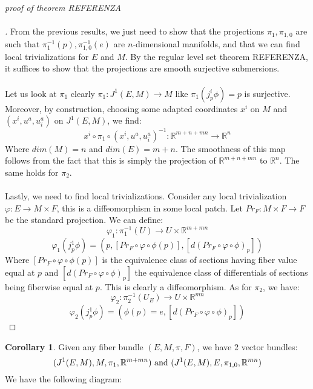 \documentclass[12pt,a4paper]{report}
\theoremstyle{definition}
\theoremstyle{Theorem}
\theoremstyle{definition}
\theoremstyle{definition}
\newtheorem{Cor}[Def]{Corollary}
\begin{document}
	\begin{proof}[proof of theorem REFERENZA\\\\]
		From the previous results, we just need to show that the projections $\pi_1,\pi_{1,0}$ are such that $\pi_1^{-1}(p),\pi^{-1}_{1,0}(e)$ are $n$-dimensional manifolds, and that we can find local trivializations for $E$ and $M$. By the regular level set theorem REFERENZA, it suffices to show that the projections are smooth surjective submersions.\\\\
		Let us look at $\pi_1$ clearly $\pi_1:J^1(E,M)\rightarrow M$ like $\pi_1(j^i_p\phi)=p$ is surjective. Moreover, by construction, choosing some adapted coordinates $x^i$ on $M$ and $(x^i,u^a,u^a_i)$ on $J^1(E,M)$, we find:
		$$x^i\circ \pi_1 \circ (x^i,u^a,u^a_i)^{-1}:\mathbb{R}^{m+n+mn}\rightarrow \mathbb{R}^n$$
		Where $dim(M)=n$ and $dim(E)=m+n$. The smoothness of this map follows from the fact that this is simply the projection of $\mathbb{R}^{m+n+mn}$ to $\mathbb{R}^n$. The same holds for $\pi_2$.\\
		\\
		Lastly, we need to find local trivializations. Consider any local trivialization $\varphi:E\rightarrow M\times F$, this is a diffeomorphism in some local patch. Let $Pr_F:M\times F\rightarrow F$ be the standard projection. We can define:
		$$\varphi_1:\pi_1^{-1}(U)\rightarrow U\times \mathbb{R}^{m+mn}$$
		$$\varphi_1(j^1_p\phi)=(p,[Pr_F\circ \varphi\circ\phi(p)],[d(Pr_F\circ \varphi\circ\phi)_p])$$
		Where $[Pr_F\circ \varphi\circ\phi(p)]$ is the equivalence class of sections having fiber value equal at $p$ and $[d(Pr_F\circ \varphi\circ\phi)_p]$ the equivalence class of differentials of sections being fiberwise equal at $p$. This is clearly a diffeomorphism. As for $\pi_2$, we have:
		$$\varphi_2:\pi_2^{-1}(U_E)\rightarrow U\times \mathbb{R}^{mn}$$
		$$\varphi_2(j_p^1\phi)=(\phi(p)=e,[d(Pr_F\circ \varphi\circ\phi)_p])$$
	\end{proof}
	\begin{Cor}
		Given any fiber bundle $(E,M,\pi,F)$, we have 2 vector bundles:
		$$(J^1(E,M),M,\pi_1,\mathbb{R}^{m+mn})\hbox{ and }(J^1(E,M),E,\pi_{1,0},\mathbb{R}^{mn})$$
		We have the following diagram:
		\begin{center}
		\end{center}
	\end{Cor}
\end{document}
